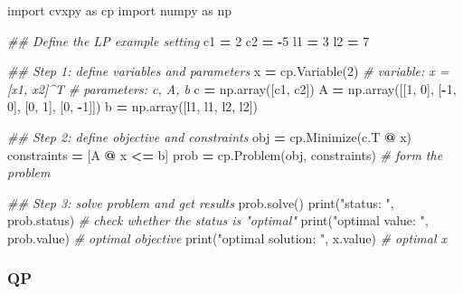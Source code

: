 \documentclass[
]{book}
\newenvironment{Shaded}{\begin{snugshade}}{\end{snugshade}}
\newcommand{\BuiltInTok}[1]{#1}
\newcommand{\CommentTok}[1]{\textcolor[rgb]{0.56,0.35,0.01}{\textit{#1}}}
\newcommand{\DecValTok}[1]{\textcolor[rgb]{0.00,0.00,0.81}{#1}}
\newcommand{\ImportTok}[1]{#1}
\newcommand{\NormalTok}[1]{#1}
\newcommand{\OperatorTok}[1]{\textcolor[rgb]{0.81,0.36,0.00}{\textbf{#1}}}
\newcommand{\StringTok}[1]{\textcolor[rgb]{0.31,0.60,0.02}{#1}}
\theoremstyle{definition}
\theoremstyle{definition}
\theoremstyle{definition}
\theoremstyle{definition}
\theoremstyle{remark}
\begin{document}
\begin{Shaded}
\begin{Highlighting}[]
\ImportTok{import}\NormalTok{ cvxpy }\ImportTok{as}\NormalTok{ cp}
\ImportTok{import}\NormalTok{ numpy }\ImportTok{as}\NormalTok{ np}

\CommentTok{\#\# Define the LP example setting}
\NormalTok{c1 }\OperatorTok{=} \DecValTok{2}
\NormalTok{c2 }\OperatorTok{=} \OperatorTok{{-}}\DecValTok{5}
\NormalTok{l1 }\OperatorTok{=} \DecValTok{3}
\NormalTok{l2 }\OperatorTok{=} \DecValTok{7}

\CommentTok{\#\# Step 1: define variables and parameters}
\NormalTok{x }\OperatorTok{=}\NormalTok{ cp.Variable(}\DecValTok{2}\NormalTok{) }\CommentTok{\# variable: x = [x1, x2]\^{}T}
\CommentTok{\# parameters: c, A, b}
\NormalTok{c }\OperatorTok{=}\NormalTok{ np.array([c1, c2]) }
\NormalTok{A }\OperatorTok{=}\NormalTok{ np.array([[}\DecValTok{1}\NormalTok{, }\DecValTok{0}\NormalTok{], [}\OperatorTok{{-}}\DecValTok{1}\NormalTok{, }\DecValTok{0}\NormalTok{], [}\DecValTok{0}\NormalTok{, }\DecValTok{1}\NormalTok{], [}\DecValTok{0}\NormalTok{, }\OperatorTok{{-}}\DecValTok{1}\NormalTok{]])}
\NormalTok{b }\OperatorTok{=}\NormalTok{ np.array([l1, l1, l2, l2])}

\CommentTok{\#\# Step 2: define objective and constraints}
\NormalTok{obj }\OperatorTok{=}\NormalTok{ cp.Minimize(c.T }\OperatorTok{@}\NormalTok{ x)}
\NormalTok{constraints }\OperatorTok{=}\NormalTok{ [A }\OperatorTok{@}\NormalTok{ x }\OperatorTok{\textless{}=}\NormalTok{ b]}
\NormalTok{prob }\OperatorTok{=}\NormalTok{ cp.Problem(obj, constraints) }\CommentTok{\# form the problem}

\CommentTok{\#\# Step 3: solve problem and get results}
\NormalTok{prob.solve()  }
\BuiltInTok{print}\NormalTok{(}\StringTok{"status: "}\NormalTok{, prob.status) }\CommentTok{\# check whether the status is "optimal"}
\BuiltInTok{print}\NormalTok{(}\StringTok{"optimal value: "}\NormalTok{, prob.value) }\CommentTok{\# optimal objective}
\BuiltInTok{print}\NormalTok{(}\StringTok{"optimal solution: "}\NormalTok{, x.value) }\CommentTok{\# optimal x}
\end{Highlighting}
\end{Shaded}

\hypertarget{qp}{%
\subsubsection{QP}\label{qp}}
\end{document}
